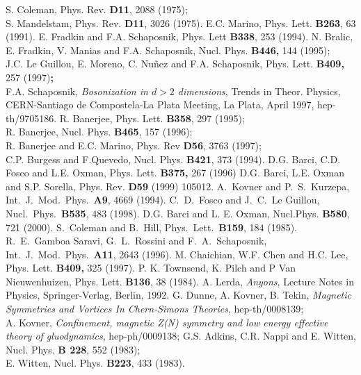 \documentclass[a4paper,12pt]{article}
\begin{document}
\newpage
\begin{thebibliography}{9}
   S. Coleman, Phys. Rev. {\bf D11}, 2088 (1975); \\S.
  Mandelstam, Phys. Rev. {\bf D11}, 3026 (1975).
 E.C. Marino, Phys. Lett. {\bf B263}, 63 (1991).
 E. Fradkin and F.A. Schaposnik, Phys. Lett {\bf
    B338}, 253 (1994).
 N. Bralic, E. Fradkin, V. Manias and F.A.
  Schaposnik,
  Nucl.  Phys. {\bf B446, }144 (1995);\\ J.C. Le Guillou, E. Moreno,
  C. Nu\~{n}ez and F.A. Schaposnik, Phys. Lett. {\bf B409, }257
  (1997){\bf ; }\\ F.A.  Schaposnik, {\it Bosonization in $d >2$
    dimensions}, Trends in Theor. Physics, CERN-Santiago de
  Compostela-La Plata Meeting, La Plata, April 1997, hep-th/9705186.
 R. Banerjee, Phys. Lett. {\bf B358}, 297 (1995); \\
  R.  Banerjee, Nucl. Phys. {\bf B465}, 157 (1996);\\ R. Banerjee and
  E.C. Marino, Phys. Rev {\bf D56}, 3763 (1997);\\ C.P. Burgess and
  F.Quevedo, Nucl. Phys.  {\bf B421}, 373 (1994).
  D.G. Barci, C.D. Fosco and L.E. Oxman, Phys. Lett. {\bf %
    B375,} 267 (1996)
 D.G. Barci, L.E. Oxman and S.P. Sorella,
  Phys. Rev.  {\bf D59} (1999) 105012.
A.~Kovner and P.~S.~Kurzepa,
Int.\ J.\ Mod.\ Phys.\  {\bf A9}, 4669 (1994).
C.~D.~Fosco and J.~C.~Le Guillou,
Nucl.\ Phys.\  {\bf B535}, 483 (1998).
 D.G. Barci and L. E. Oxman, Nucl.Phys. {\bf B580}, 721
  (2000).
S.~Coleman and B.~Hill,
  Phys.~Lett.~{\bf B159}, 184 (1985).
 R.~E.~Gamboa Saravi, G.~L.~Rossini and F.~A.~Schaposnik,
Int.\ J.\ Mod.\ Phys.\  {\bf A11}, 2643 (1996).
  M. Chaichian, W.F. Chen and H.C. Lee, Phys. Lett. {\bf %
    B409,} 325 (1997).
 P. K. Townsend, K. Pilch and P Van Nieuwenhuizen,
  Phys. Lett. {\bf B136}, 38 (1984).
A. Lerda, {\em Anyons}, Lecture Notes in Physics,
  Springer-Verlag, Berlin, 1992.
 G. Dunne, A. Kovner, B. Tekin, {\it Magnetic Symmetries and Vortices In Chern-Simons Theories}, {hep-th/0008139}; \\
 A. Kovner, {\it Confinement, magnetic Z(N) symmetry and low energy effective theory of gluodynamics}, {hep-ph/0009138}; 
 G.S. Adkins, C.R. Nappi and E. Witten, Nucl. Phys. {\bf B 228}, 
552 (1983);\\E. Witten, Nucl. Phys. {\bf B223}, 433 (1983).
  
\end{thebibliography}
\end{document}
